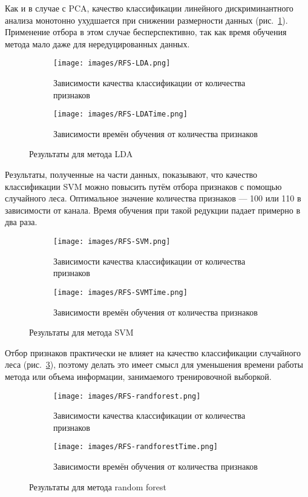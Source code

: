 \par
Как и в случае с PCA, качество классификации линейного дискриминантного анализа монотонно ухудшается при снижении размерности данных (рис.~\ref{fig:lda_rfs}). Применение отбора в этом случае бесперспективно, так как время обучения метода мало даже для нередуцированных данных.

\begin{figure}[h!]
    \centering
	\begin{subfigure}{0.45\textwidth}
		\texttt{[image: images/RFS-LDA.png]}
		\caption{Зависимости качества классификации от количества признаков}
	\end{subfigure}
	\begin{subfigure}{0.45\textwidth}
		\texttt{[image: images/RFS-LDATime.png]}
		\caption{Зависимости времён обучения от количества признаков}
	\end{subfigure}
	\caption{Результаты для метода LDA}\label{fig:lda_rfs}
\end{figure}

\par
Результаты, полученные на части данных, показывают, что качество классификации SVM можно повысить путём отбора признаков с помощью случайного леса. Оптимальное значение количества признаков --- 100 или 110 в зависимости от канала. Время обучения при такой редукции падает примерно в два раза.

\begin{figure}[h!]
    \centering
	\begin{subfigure}{0.45\textwidth}
		\texttt{[image: images/RFS-SVM.png]}
		\caption{Зависимости качества классификации от количества признаков}
	\end{subfigure}
	\begin{subfigure}{0.45\textwidth}
		\texttt{[image: images/RFS-SVMTime.png]}
		\caption{Зависимости времён обучения от количества признаков}
	\end{subfigure}
	\caption{Результаты для метода SVM}\label{fig:svm_rfs}
\end{figure}

\par
Отбор признаков практически не влияет на качество классификации случайного леса (рис.~\ref{fig:randfor_rfs}), поэтому делать это имеет  смысл для уменьшения времени работы метода или объема информации, занимаемого тренировочной выборкой.

\begin{figure}[h!]
    \centering
	\begin{subfigure}{0.45\textwidth}
		\texttt{[image: images/RFS-randforest.png]}
		\caption{Зависимости качества классификации от количества признаков}
	\end{subfigure}
	\begin{subfigure}{0.45\textwidth}
		\texttt{[image: images/RFS-randforestTime.png]}
		\caption{Зависимости времён обучения от количества признаков}
	\end{subfigure}
	\caption{Результаты для метода random forest}\label{fig:randfor_rfs}
\end{figure} 


